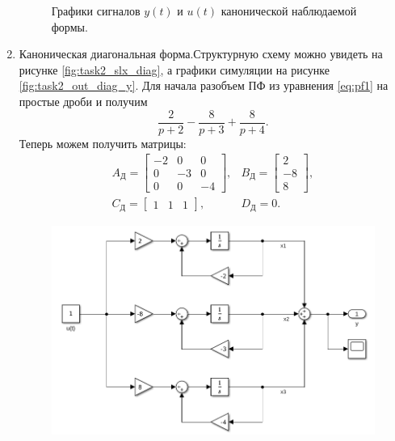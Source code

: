 \begin{enumerate}
\begin{figure}[htbp]
        \caption{Графики сигналов $y(t)$ и $u(t)$ канонической наблюдаемой формы.}
        \label{fig:task2_out_wtch_y}
    \end{figure}

    \item Каноническая диагональная форма.Структурную схему можно увидеть
    на рисунке \ref{fig:task2_slx_diag}, а графики симуляции на рисунке 
    \ref{fig:task2_out_diag_y}.
    Для начала разобъем ПФ из уравнения \ref{eq:pf1} на простые дроби и получим
    \begin{equation*}
        \frac{2}{p+2}-\frac{8}{p+3}+\frac{8}{p+4}.
    \end{equation*}
    Теперь можем получить матрицы:
    \begin{equation*}
        \begin{array}{cc}
            A_\text{Д}=\begin{bmatrix}
                -2 & 0 & 0 \\
                0 & -3 & 0 \\
                0 & 0 & -4
            \end{bmatrix}, &
            B_\text{Д}=\begin{bmatrix}
                2 \\ -8 \\ 8
            \end{bmatrix}, \\[7mm]
            C_\text{Д}=\begin{bmatrix}
                1 & 1 & 1
            \end{bmatrix}, &
            D_\text{Д}=0.
        \end{array}
    \end{equation*}
    \begin{figure}[htbp]
        \centering
        \includegraphics[width=0.9\linewidth]{figs/task_2_slx_diag.png}

\end{figure}
\end{enumerate}
